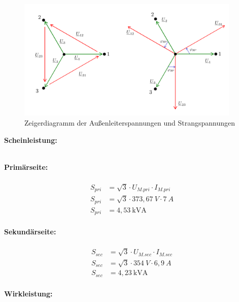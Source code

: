 \begin{enumerate}[label=\alph*)]
	      \begin{figure}[h!]
		      \begin{center}
			      \includegraphics[width=0.95\textwidth]{img/4.2.1.2}
		      \end{center}
		      \caption{Zeigerdiagramm der Außenleiterspannungen und Strangspannungen}\label{img:4.2.1.2}
	      \end{figure}

	      \textbf{Scheinleistung:}\\ \ \\
	      \begin{tcolorbox}[colback=gray!30,
			      colframe=black,
			      width=0.9\textwidth,
		      ]
		      \parbox{\textwidth}{

			      \begin{minipage}{0.5\textwidth}
				      \textbf{Primärseite:}\\ \ \\
				      \begin{align*}
					      S_{pri} & = \sqrt3\cdot U_{M.pri}\cdot I_{M.pri} \\
					      S_{pri} & = \sqrt3\cdot 373,67\ V\cdot 7\ A      \\
					      S_{pri} & = 4,53\ \text{kVA}                     \\
				      \end{align*}
			      \end{minipage}\hfill
			      \begin{minipage}{0.5\textwidth}
				      \textbf{Sekundärseite:}\\ \ \\
				      \begin{align*}
					      S_{sec} & = \sqrt3\cdot U_{M.sec}\cdot I_{M.sec} \\
					      S_{sec} & = \sqrt3\cdot 354\ V\cdot 6,9\ A       \\
					      S_{sec} & = 4,23\ \text{kVA}                     \\
				      \end{align*}
			      \end{minipage}
		      }
	      \end{tcolorbox}
	      \textbf{Wirkleistung:}\\ \ \\
	      \begin{tcolorbox}[colback=gray!30,
			      colframe=black,
			      width=0.9\textwidth,
		      ]
		      \parbox{\textwidth}{

}
\end{tcolorbox}
\end{enumerate}
